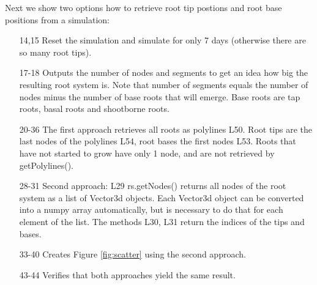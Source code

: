 \documentclass[a4paper]{article}
\begin{document}
Next we show two options how to retrieve root tip postions and root base positions from a simulation:



\begin{itemize}

\item[14,15] Reset the simulation and simulate for only 7 days (otherwise there are so many root tips).

\item[17-18] Outputs the number of nodes and segments to get an idea how big the resulting root system is. Note that number of segments equals the number of nodes minus the number of base roots that will emerge. Base roots are tap roots, basal roots and shootborne roots.

\item[20-36] The first approach retrieves all roots as polylines L50. Root tips are the last nodes of the polylines L54, root bases the first nodes L53. Roots that have not started to grow have only 1 node, and are not retrieved by getPolylines().

\item[28-31] Second approach: L29 rs.getNodes() returns all nodes of the root system as a list of Vector3d objects. Each Vector3d object can be converted into a numpy array automatically, but is necessary to do that for each element of the list. The methods L30, L31 return the indices of the tips and bases. 

\item[33-40] Creates Figure \ref{fig:scatter} using the second approach.

\item[43-44] Verifies that both approaches yield the same result.

\end{itemize}
\end{document}
